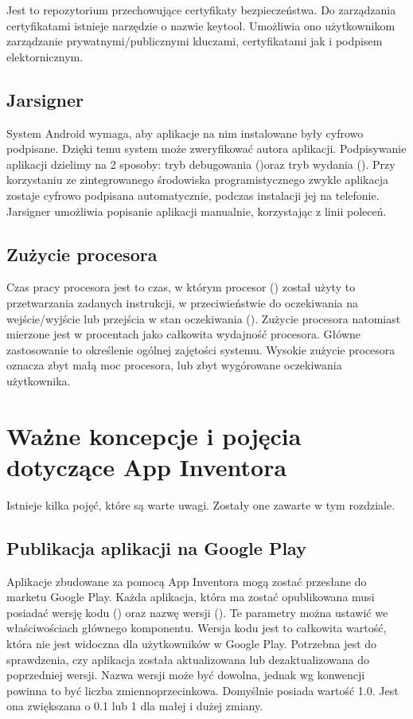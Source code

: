 Jest to repozytorium przechowujące certyfikaty bezpieczeństwa. Do zarządzania certyfikatami istnieje narzędzie o nazwie keytool. Umożliwia ono użytkownikom zarządzanie prywatnymi/publicznymi kluczami, certyfikatami jak i podpisem elektornicznym.\cite{doc:keytool}

\subsection{Jarsigner}

System Android wymaga, aby aplikacje na nim instalowane były cyfrowo podpisane. Dzięki temu system może zweryfikować autora aplikacji. Podpisywanie aplikacji dzielimy na 2 sposoby: tryb debugowania ()oraz tryb wydania (). Przy korzystaniu ze zintegrowanego środowiska programistycznego zwykle aplikacja zostaje cyfrowo podpisana automatycznie, podczas instalacji jej na telefonie. Jarsigner umożliwia popisanie aplikacji manualnie, korzystając z linii poleceń.

\subsection{Zużycie procesora}

Czas pracy procesora jest to czas, w którym procesor () został użyty to przetwarzania zadanych instrukcji, w przeciwieństwie do oczekiwania na wejście/wyjście lub przejścia w stan oczekiwania (). Zużycie procesora natomiast mierzone jest w procentach jako całkowita wydajność procesora. Główne zastosowanie to określenie ogólnej zajętości systemu. Wysokie zużycie procesora oznacza zbyt małą moc procesora, lub zbyt wygórowane oczekiwania użytkownika.


\section{Ważne koncepcje i pojęcia dotyczące App Inventora}

Istnieje kilka pojęć, które są warte uwagi. Zostały one zawarte w tym rozdziale.

\subsection{Publikacja aplikacji na Google Play}

Aplikacje zbudowane za pomocą App Inventora mogą zostać przesłane do marketu Google Play. Każda aplikacja, która ma zostać opublikowana musi posiadać wersję kodu () oraz nazwę wersji (). Te parametry można ustawić we właściwościach głównego komponentu\cite{doc:concepts}. Wersja kodu jest to całkowita wartość, która nie jest widoczna dla użytkowników w Google Play. Potrzebna jest do sprawdzenia, czy aplikacja została aktualizowana lub dezaktualizowana do poprzedniej wersji. Nazwa wersji może być dowolna, jednak wg konwencji powinna to być liczba zmiennoprzecinkowa. Domyślnie posiada wartość 1.0. Jest ona zwiększana o 0.1 lub 1 dla małej i dużej zmiany.

